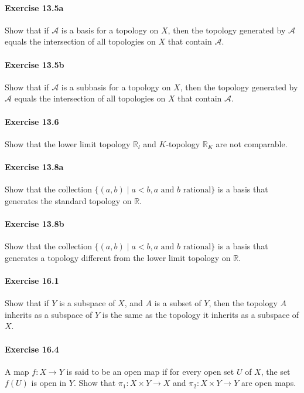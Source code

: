 \documentclass{article}
\begin{document}
\paragraph{Exercise 13.5a} Show that if $\mathcal{A}$ is a basis for a topology on $X$, then the topology generated by $\mathcal{A}$ equals the intersection of all topologies on $X$ that contain $\mathcal{A}$.

\paragraph{Exercise 13.5b} Show that if $\mathcal{A}$ is a subbasis for a topology on $X$, then the topology generated by $\mathcal{A}$ equals the intersection of all topologies on $X$ that contain $\mathcal{A}$.

\paragraph{Exercise 13.6} Show that the lower limit topology $\mathbb{R}_l$ and $K$-topology $\mathbb{R}_K$ are not comparable.

\paragraph{Exercise 13.8a} Show that the collection $\{(a,b) \mid a < b, a \text{ and } b \text{ rational}\}$ is a basis that generates the standard topology on $\mathbb{R}$.

\paragraph{Exercise 13.8b} Show that the collection $\{(a,b) \mid a < b, a \text{ and } b \text{ rational}\}$ is a basis that generates a topology different from the lower limit topology on $\mathbb{R}$.

\paragraph{Exercise 16.1} Show that if $Y$ is a subspace of $X$, and $A$ is a subset of $Y$, then the topology $A$ inherits as a subspace of $Y$ is the same as the topology it inherits as a subspace of $X$.

\paragraph{Exercise 16.4} A map $f: X \rightarrow Y$ is said to be an open map if for every open set $U$ of $X$, the set $f(U)$ is open in $Y$. Show that $\pi_{1}: X \times Y \rightarrow X$ and $\pi_{2}: X \times Y \rightarrow Y$ are open maps.
\end{document}

